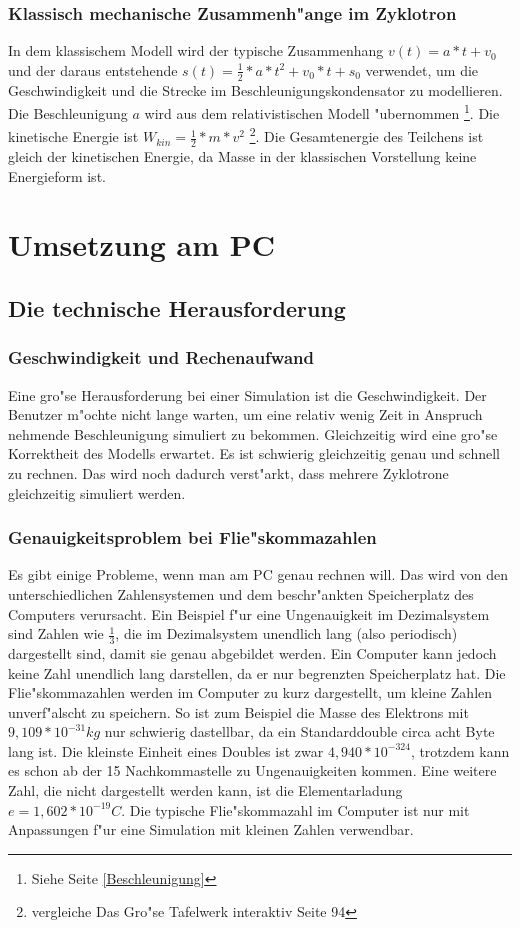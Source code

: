 \documentclass[14pt, a4paper]{report}
\begin{document}
\section{Klassisch mechanische Zusammenh"ange im Zyklotron}
In dem klassischem Modell wird der typische Zusammenhang $v(t) = a*t + v_0$ und
der daraus entstehende $s(t) = \frac{1}{2} *a *t^2 + v_0 *t + s_0$ verwendet, um die
Geschwindigkeit und die Strecke im Beschleunigungskondensator zu modellieren. Die 
Beschleunigung $a$ wird aus dem  relativistischen Modell "ubernommen 
\footnote{Siehe Seite \pageref{Beschleunigung} \ref{Beschleunigung}}. Die kinetische 
Energie ist $ W_{kin} = \frac{1}{2} * m * v^2 $ \footnote{vergleiche Das Gro"se Tafelwerk 
interaktiv Seite 94}. Die Gesamtenergie des Teilchens ist gleich der kinetischen
Energie, da Masse in der klassischen Vorstellung keine Energieform ist.

\part{Umsetzung am PC}
\chapter{Die technische Herausforderung}
\section{Geschwindigkeit und Rechenaufwand}
Eine gro"se Herausforderung bei einer Simulation ist die Geschwindigkeit. Der Benutzer
m"ochte nicht lange warten, um eine relativ wenig Zeit in Anspruch nehmende 
Beschleunigung simuliert zu bekommen. 
Gleichzeitig wird eine gro"se Korrektheit des Modells
erwartet. Es ist schwierig gleichzeitig genau und schnell zu rechnen. Das wird 
noch dadurch verst"arkt, dass mehrere Zyklotrone gleichzeitig simuliert werden.


\section{Genauigkeitsproblem bei Flie"skommazahlen}
Es gibt einige Probleme, wenn man am PC genau rechnen will. Das wird von den 
unterschiedlichen Zahlensystemen und dem beschr"ankten Speicherplatz des Computers 
verursacht. Ein Beispiel f"ur eine Ungenauigkeit im Dezimalsystem sind Zahlen
wie $\frac{1}{3}$, die im Dezimalsystem unendlich lang (also periodisch)
 dargestellt sind, damit sie genau
abgebildet werden. Ein Computer kann jedoch keine Zahl unendlich lang darstellen, da
er nur begrenzten Speicherplatz hat. Die Flie"skommazahlen werden im Computer zu kurz
dargestellt, um kleine Zahlen unverf"alscht zu speichern. So ist zum Beispiel die 
Masse des Elektrons mit $9,109 * 10^{-31} kg$ nur schwierig dastellbar, da ein 
Standarddouble circa acht Byte lang ist. Die kleinste Einheit eines Doubles ist zwar
$4,940 * 10^{-324}$, trotzdem kann es schon ab der 15 Nachkommastelle zu 
Ungenauigkeiten kommen. Eine weitere Zahl, die nicht dargestellt werden
kann, ist die Elementarladung $e = 1,602 * 10^{-19} C$. Die typische 
Flie"skommazahl im Computer ist nur mit Anpassungen f"ur eine Simulation mit kleinen
Zahlen verwendbar.
\end{document}
